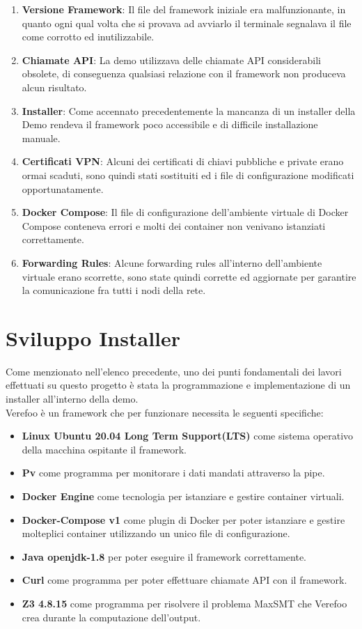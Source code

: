 \begin{enumerate}
    \item \textbf{Versione Framework}: Il file del framework iniziale era malfunzionante, in quanto ogni qual volta che si provava ad avviarlo il terminale segnalava il file come corrotto ed inutilizzabile.
    \item \textbf{Chiamate API}: La demo utilizzava delle chiamate API considerabili obsolete, di conseguenza qualsiasi relazione con il framework non produceva alcun risultato.
    \item \textbf{Installer}: Come accennato precedentemente la mancanza di un installer della Demo rendeva il framework poco accessibile e di difficile installazione manuale.
    \item \textbf{Certificati VPN}: Alcuni dei certificati di chiavi pubbliche e private erano ormai scaduti, sono quindi stati sostituiti ed i file di configurazione modificati opportunatamente.
    \item \textbf{Docker Compose}: Il file di configurazione dell'ambiente virtuale di Docker Compose conteneva errori e molti dei container non venivano istanziati correttamente.
    \item \textbf{Forwarding Rules}: Alcune forwarding rules all'interno dell'ambiente virtuale erano scorrette, sono state quindi corrette ed aggiornate per garantire la comunicazione fra tutti i nodi della rete.
\end{enumerate}

    
\section{Sviluppo Installer}
Come menzionato nell'elenco precedente, uno dei punti fondamentali dei lavori effettuati su questo progetto è stata la programmazione e implementazione di un installer all'interno della demo.\\
Verefoo è un framework che per funzionare necessita le seguenti specifiche:
\begin{itemize}
    \item \textbf{Linux Ubuntu 20.04 Long Term Support(LTS)} come sistema operativo della macchina ospitante il framework.
    \item \textbf{Pv} come programma per monitorare i dati mandati attraverso la pipe.
    \item \textbf{Docker Engine} come tecnologia per istanziare e gestire container virtuali.
    \item \textbf{Docker-Compose v1} come plugin di Docker per poter istanziare e gestire molteplici container utilizzando un unico file di configurazione.
    \item  \textbf{Java openjdk-1.8} per poter eseguire il framework correttamente.
    \item \textbf{Curl} come programma per poter effettuare chiamate API con il framework.
    \item \textbf{Z3 4.8.15} come programma per risolvere il problema MaxSMT che Verefoo crea durante la computazione dell'output.
\end{itemize} 

